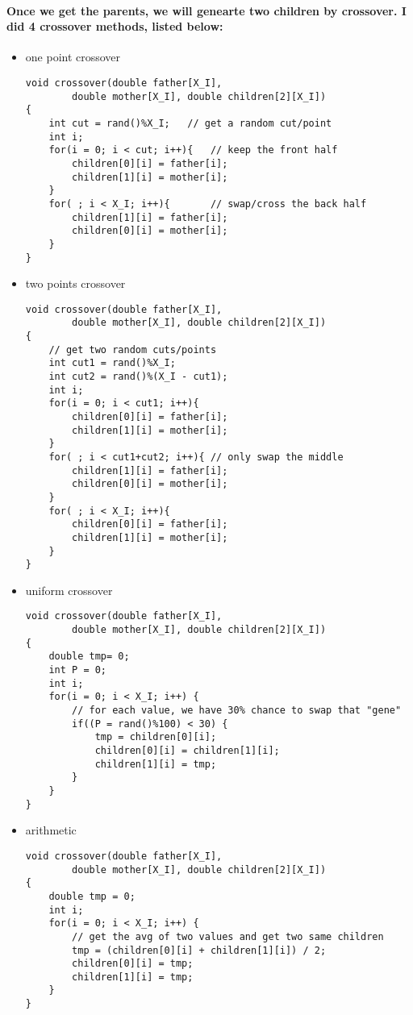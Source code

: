 \documentclass[12pt]{article}
\begin{document}
\paragraph{Once we get the parents, we will genearte two children by crossover. I did 4 crossover methods, listed below:}
\begin{itemize}
	\item one point crossover
	\begin{lstlisting}
void crossover(double father[X_I], 
		double mother[X_I], double children[2][X_I])
{
	int cut = rand()%X_I;	// get a random cut/point 
	int i;
	for(i = 0; i < cut; i++){	// keep the front half
		children[0][i] = father[i];
		children[1][i] = mother[i];
	}
	for( ; i < X_I; i++){		// swap/cross the back half
		children[1][i] = father[i];
		children[0][i] = mother[i];
	}
}
	\end{lstlisting}
	
	\item two points crossover
	\begin{lstlisting}
void crossover(double father[X_I], 
		double mother[X_I], double children[2][X_I])
{
	// get two random cuts/points
	int cut1 = rand()%X_I;
	int cut2 = rand()%(X_I - cut1);
	int i;
	for(i = 0; i < cut1; i++){	
		children[0][i] = father[i];
		children[1][i] = mother[i];
	}
	for( ; i < cut1+cut2; i++){	// only swap the middle
		children[1][i] = father[i];
		children[0][i] = mother[i];
	}
	for( ; i < X_I; i++){
		children[0][i] = father[i];
		children[1][i] = mother[i];
	}
}
	\end{lstlisting}
	
	\item uniform crossover
	\begin{lstlisting}
void crossover(double father[X_I], 
		double mother[X_I], double children[2][X_I])
{
	double tmp= 0;
	int P = 0;
	int i;
	for(i = 0; i < X_I; i++) {
		// for each value, we have 30% chance to swap that "gene"
		if((P = rand()%100) < 30) {
			tmp = children[0][i];
			children[0][i] = children[1][i];
			children[1][i] = tmp;
		}
	}
}
	\end{lstlisting}
	
	\item arithmetic
	\begin{lstlisting}
void crossover(double father[X_I], 
		double mother[X_I], double children[2][X_I])
{
	double tmp = 0;
	int i;
	for(i = 0; i < X_I; i++) {
		// get the avg of two values and get two same children
		tmp = (children[0][i] + children[1][i]) / 2;
		children[0][i] = tmp;
		children[1][i] = tmp;
	}
}
	\end{lstlisting}
\end{itemize}
\end{document}
